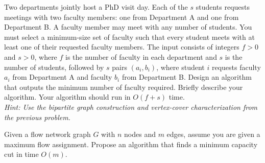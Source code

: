\documentclass{cs0500}
\begin{document}
\newpage
\begin{problem}
Two departments jointly host a PhD visit day. Each of the $s$ students requests meetings with two faculty members: one from Department A and one from Department B. A faculty member may meet with any number of students. You must select a minimum-size set of faculty such that every student meets with at least one of their requested faculty members. The input consists of integers $f>0$ and $s>0$, where $f$ is the number of faculty in each department and $s$ is the number of students, followed by $s$ pairs $(a_i,b_i)$, where student $i$ requests faculty $a_i$ from Department A and faculty $b_i$ from Department B. Design an algorithm that outputs the minimum number of faculty required. Briefly describe your algorithm. Your algorithm should run in $O(f + s)$ time. 
\\ \emph{Hint: Use the bipartite graph construction and vertex-cover characterization from the previous problem.}

\end{problem}
\begin{solution}
    
\end{solution}
\newpage 
\begin{problem}
Given a flow network graph $G$ with $n$ nodes and $m$ edges, assume you are given a maximum flow assignment. Propose an algorithm that finds a minimum capacity cut in time $O(m)$.
\end{problem}
\begin{solution}
    
\end{solution}
\end{document}
